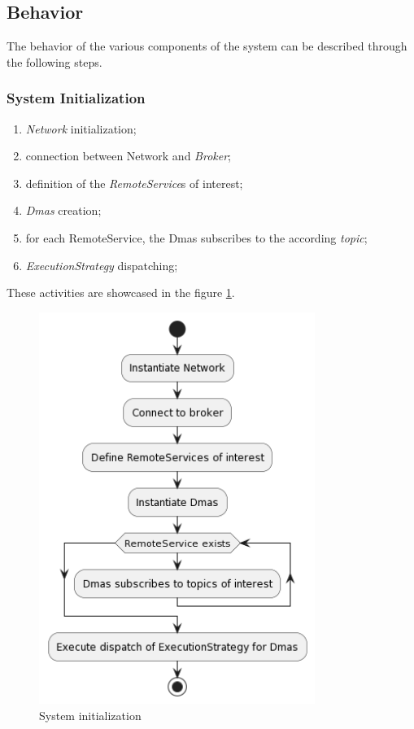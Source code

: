 \subsection{Behavior}
The behavior of the various components of the system can be described through the following steps.

\subsubsection{System Initialization}

\begin{enumerate}
    \item \textit{Network} initialization;
    \item connection between Network and \textit{Broker};
    \item definition of the \textit{RemoteService}s of interest;
    \item \textit{Dmas} creation;
    \item for each RemoteService, the Dmas subscribes to the according \textit{topic};
    \item \textit{ExecutionStrategy} dispatching;
\end{enumerate}

These activities are showcased in the figure \ref{fig:initialization}.

\begin{figure}
    \centering
    \includegraphics[width=0.8\textwidth]{figures/activity-dmas.png}
    \caption{System initialization}
    \label{fig:initialization}
\end{figure}

